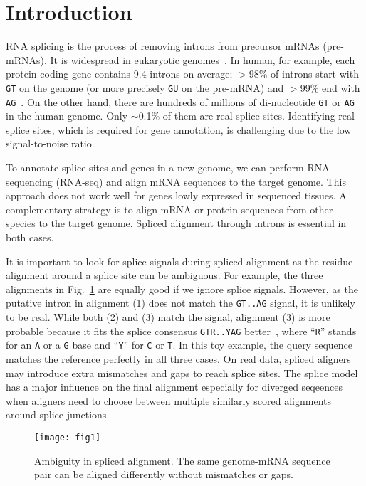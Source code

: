 \documentclass[webpdf,contemporary,large,namedate]{oup-authoring-template}%
\begin{document}
\section{Introduction}

RNA splicing is the process of removing introns from precursor mRNAs (pre-mRNAs).
It is widespread in eukaryotic genomes~\citep{Keren:2010aa}.
In human, for example, each protein-coding gene contains 9.4 introns on average;
$>$98\% of introns start with {\tt GT} on the genome (or more precisely {\tt GU} on the pre-mRNA)
and $>$99\% end with {\tt AG}~\citep{Sibley:2016vh}.
On the other hand, there are hundreds of millions of di-nucleotide {\tt GT} or {\tt AG}
in the human genome.
Only $\sim$0.1\% of them are real splice sites.
Identifying real splice sites, which is required for gene annotation,
is challenging due to the low signal-to-noise ratio.

To annotate splice sites and genes in a new genome,
we can perform RNA sequencing (RNA-seq) and align mRNA sequences to the target genome.
This approach does not work well for genes lowly expressed in sequenced tissues.
A complementary strategy is to align mRNA or protein sequences from other species to the target genome.
Spliced alignment through introns is essential in both cases.

It is important to look for splice signals during spliced alignment
as the residue alignment around a splice site can be ambiguous.
For example, the three alignments in Fig.~\ref{fig:1} are equally good if we ignore splice signals.
However, as the putative intron in alignment (1) does not match the {\tt GT..AG}
signal, it is unlikely to be real.
While both (2) and (3) match the signal,
alignment (3) is more probable because it fits the splice consensus {\tt GTR..YAG} better~\citep{Irimia:2008aa,Iwata:2011aa},
where ``{\tt R}'' stands for an {\tt A} or a {\tt G} base and ``{\tt Y}'' for {\tt C} or {\tt T}.
In this toy example, the query sequence matches the reference perfectly in all three cases.
On real data, spliced aligners may introduce extra mismatches and gaps to reach splice sites.
The splice model has a major influence on the final alignment especially for diverged seqeences
when aligners need to choose between multiple similarly scored alignments around splice junctions.

\begin{figure}[b]
\centering
\texttt{[image: fig1]}
\caption{Ambiguity in spliced alignment.
The same genome-mRNA sequence pair can be aligned differently without mismatches or gaps.}\label{fig:1}
\end{figure}
\end{document}
